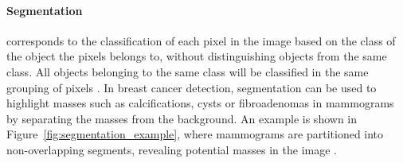 \paragraph{Segmentation} corresponds to the classification of each pixel in the image based on the class of the object the pixels belongs to, without distinguishing objects from the same class. All objects belonging to the same class will be classified in the same grouping of pixels \citep{Geron2019}. In breast cancer detection, segmentation can be used to highlight masses such as calcifications, cysts or fibroadenomas \citep{breastcancerorg2018} in mammograms by separating the masses from the background. An example is shown in Figure~\ref{fig:segmentation_example}, where mammograms are partitioned into non-overlapping segments, revealing potential masses in the image \citep{Punitha2018}.\\

